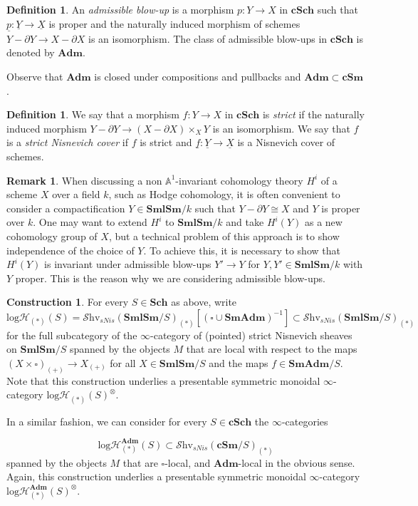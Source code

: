 \documentclass[11pt, a4paper]{amsart}
\theoremstyle{definition}
\newtheorem{df}[thm]{Definition}
\newtheorem{const}[thm]{Construction}
\newtheorem{rmk}[thm]{Remark}
\numberwithin{equation}{subsection}
\newcommand{\A}{\mathbb{A}}
\newcommand{\Sch}{\mathbf{Sch}}
\newcommand{\cSm}{\mathbf{cSm}}
\newcommand{\cSch}{\mathbf{cSch}}
\newcommand{\SmlSm}{\mathbf{SmlSm}}
\newcommand{\Adm}{\mathbf{Adm}}
\newcommand{\SmAdm}{\mathbf{SmAdm}}
\renewcommand{\ul}{\underline}
\newcommand{\boxx}{\square}
\newcommand{\infShv}{\mathcal{S}\mathrm{hv}}
\newcommand{\inflogH}{\mathrm{log}\mathcal{H}}
\newcommand{\inflogHpt}{\mathrm{log}\mathcal{H}_\ast}
\begin{document}
\begin{df}
\label{ProplogSH.2}
An \emph{admissible blow-up}  is a morphism $p\colon Y\to X$ in $\cSch$ 
such that $\ul{p}\colon \ul{Y}\to \ul{X}$ is proper and the naturally induced morphism of schemes 
$Y-\partial Y\to X-\partial X$ is an isomorphism.
The class of admissible blow-ups in $\cSch$ is denoted by $\Adm$.\index[notation]{Adm @ $\Adm$}

Observe that $\Adm$ is closed under compositions and pullbacks and $\Adm\subset \cSm$.
\end{df}
\begin{df}
We say that a morphism $f\colon Y\to X$ in $\cSch$ is \emph{strict} if the naturally induced morphism $Y-\partial Y\to (X-\partial X)\times_X Y$ is an isomorphism.
We say that $f$ is a \emph{strict Nisnevich cover} if $f$ is strict and $\ul{f}\colon \ul{Y}\to \ul{X}$ is a Nisnevich cover of schemes.
\end{df}



\begin{rmk}
When discussing a non $\A^1$-invariant cohomology theory $H^i$ of a scheme $X$ over a field $k$,  
such as Hodge cohomology, 
it is often convenient to consider a compactification $Y\in \SmlSm/k$ such that $Y-\partial Y\cong X$ 
and $Y$ is proper over $k$.
One may want to extend $H^i$ to $\SmlSm/k$ and take $H^i(Y)$ as a new cohomology group of $X$, 
but a technical problem of this approach is to show independence of the choice of $Y$.
To achieve this, 
it is necessary to show that $H^i(Y)$ is invariant under admissible blow-ups $Y'\to Y$ for $
Y,Y'\in \SmlSm/k$ with $Y$ proper.
This is the reason why we are considering admissible blow-ups.
\end{rmk}
\begin{const}\label{constr:Adm_unstable}
For every $S\in \Sch$ as above, write \index[notation]{logH @ $\inflogH$}\index[notation]{logHpt @ $\inflogHpt$}
\[
\inflogH_{(\ast)}(S)=\infShv_{sNis} (\SmlSm/S)_{(\ast)}[(\boxx\cup \SmAdm)^{-1}] \subset \infShv_{sNis} (\SmlSm/S)_{(\ast)}
\]
for the full subcategory of the $\infty$-category of (pointed) strict Nisnevich sheaves on $\SmlSm/S$ spanned by the objects $M$ that are local with respect to the maps $(X\times \boxx)_{(+)}\to X_{(+)}$ for all $X\in \SmlSm/S$ and the maps $f\in \SmAdm/S$. Note that this construction underlies a presentable symmetric monoidal $\infty$-category $\inflogH_{(\ast)}(S)^\otimes$.

In a similar fashion, we can consider for every $S\in \cSch$ the $\infty$-categories

\[\inflogH^{\Adm}_{(\ast)}(S)\subset\infShv_{sNis}(\cSm/S)_{(\ast)}\]
spanned by the objects $M$ that are $\boxx$-local, and $\Adm$-local in the obvious sense. Again, this construction underlies a presentable symmetric monoidal $\infty$-category $\inflogH^{\Adm}_{(\ast)}(S)^\otimes$.
\end{const}
\end{document}
